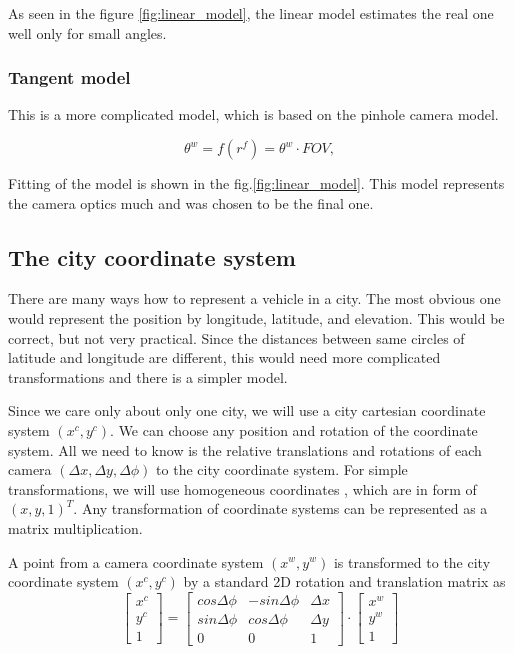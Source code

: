\documentclass[a4paper,11pt,titlepage,twoside]{article}
\numberwithin{figure}{section}
\begin{document}
As seen in the figure \ref{fig:linear_model}, the linear model estimates the real one well only for small angles.

\subsubsection{Tangent model}

This is a more complicated model, which is based on the pinhole camera model.

\begin{equation}
\theta^w = f(r^f) = \theta^w \cdot FOV,
\end{equation}

Fitting of the model is shown in the fig.\ref{fig:linear_model}. This model represents the camera optics much and was chosen to be the final one.

\subsection{The city coordinate system}

There are many ways how to represent a vehicle in a city. The most obvious one would represent the position by longitude, latitude, and elevation. This would be correct, but not very practical. Since the distances between same circles of latitude and longitude are different, this would need more complicated transformations and there is a simpler model. 

Since we care only about only one city, we will use a city cartesian coordinate system $(x^c, y^c)$. We can choose any position and rotation of the coordinate system. All we need to know is the relative translations and rotations of each camera $(\Delta x, \Delta y, \Delta\phi)$ to the city coordinate system. For simple transformations, we will use homogeneous coordinates \cite{riesenfeld1981homogeneous}, which are in form of $(x, y, 1)^T$. Any transformation of coordinate systems can be represented as a matrix multiplication.

A point from a camera coordinate system $(x^w, y^w)$ is transformed to the city coordinate system $(x^c, y^c)$ by a standard 2D rotation and translation matrix \cite{riesenfeld1981homogeneous} as
\[
  \begin{bmatrix}
    x^c \\
    y^c \\
    1
  \end{bmatrix}
   = 
  \begin{bmatrix}
    cos\Delta\phi & -sin\Delta\phi & \Delta x\\
    sin\Delta\phi & cos\Delta\phi & \Delta y\\
    0 & 0 & 1
  \end{bmatrix}   
  \cdot 
  \begin{bmatrix}
    x^w \\
    y^w \\
    1
  \end{bmatrix}
\]
\end{document}

